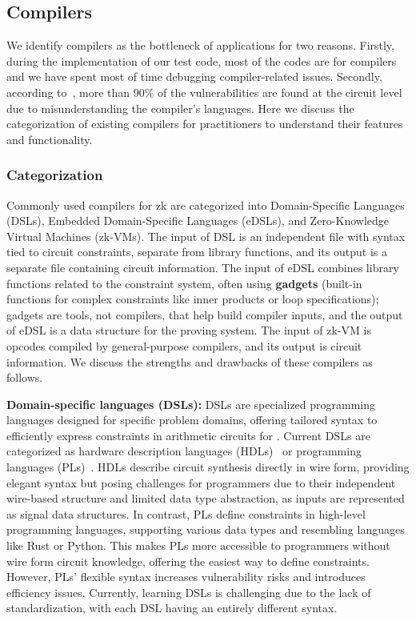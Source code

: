 \documentclass[letterpaper,twocolumn,10pt]{article}
\theoremstyle{definition}
\newcommand{\mypara}[1]{\noindent\textbf{{#1: }}}
\newcommand{\zk}{\text{zk-SNARK}\xspace}
\newcommand{\ZK}{\text{zk-SNARK}\xspace}
\newcommand{\new}[1]{{#1}\xspace}
\begin{document}
\subsection{Compilers}
\label{sec:compiler}
\new{We identify compilers as the bottleneck of \ZK applications for two reasons. Firstly, during the implementation of our test code, most of the codes are for compilers and we have spent most of time debugging compiler-related issues. Secondly, according to~\cite{chaliasos2024sok}, more than 90\% of the vulnerabilities are found at the circuit level due to misunderstanding the compiler's languages. Here we discuss the categorization of existing compilers for practitioners to understand their features and functionality.
}
\subsubsection{Categorization}
\new{Commonly used compilers for zk are categorized into Domain-Specific Languages (DSLs), Embedded Domain-Specific Languages (eDSLs), and Zero-Knowledge Virtual Machines (zk-VMs). The input of DSL is an independent file with syntax tied to circuit constraints, separate from library functions, and its output is a separate file containing circuit information. The input of eDSL combines library functions related to the constraint system, often using \textbf{gadgets} (built-in functions for complex constraints like inner products or loop specifications); gadgets are tools, not compilers, that help build compiler inputs, and the output of eDSL is a data structure for the proving system. The input of zk-VM is opcodes compiled by general-purpose compilers, and its output is circuit information. We discuss the strengths and drawbacks of these compilers as follows. 
}


\new{\mypara{Domain-specific languages (DSLs)}DSLs are specialized programming languages designed for specific problem domains, offering tailored syntax to efficiently express constraints in arithmetic circuits for \zk. Current DSLs are categorized as hardware description languages (HDLs)~\cite{belles2022circom} or programming languages (PLs)~\cite{chin2021leo,ozdemir2022circ,amin2023lurk,eberhardt2018zokrates}. HDLs describe circuit synthesis directly in wire form, providing elegant syntax but posing challenges for programmers due to their independent wire-based structure and limited data type abstraction, as inputs are represented as signal data structures. In contrast, PLs define constraints in high-level programming languages, supporting various data types and resembling languages like Rust or Python. This makes PLs more accessible to programmers without wire form circuit knowledge, offering the easiest way to define constraints. However, PLs' flexible syntax increases vulnerability risks and introduces efficiency issues. Currently, learning DSLs is challenging due to the lack of standardization, with each DSL having an entirely different syntax.}
\end{document}
